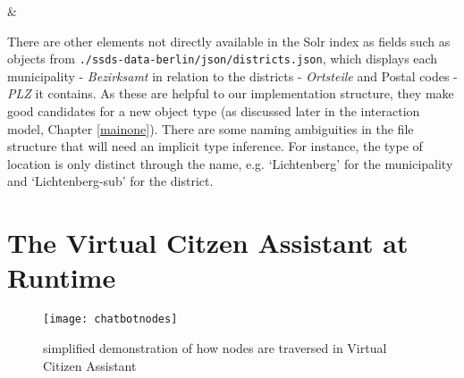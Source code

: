 \begin{table}[H]
\begin{tabu}
								 &  \\		

		
		
	\end{tabu}
\end{table}
















There are other elements not directly available in the Solr index as fields such as objects from \texttt{./ssds-data-berlin/json/districts.json}, which displays each municipality - \textit{Bezirksamt} in relation to the districts - \textit{Ortsteile} and Postal codes - \textit{PLZ} it contains.  As these are helpful to our implementation structure, they make good candidates for a new object type (as discussed later in the interaction model, Chapter \ref{mainone}).  There are some naming ambiguities in the file structure that will need an implicit type inference. For instance, the type of location is only distinct through the name, e.g. `Lichtenberg' for the municipality and `Lichtenberg-sub' for the district.






\section{The Virtual Citzen Assistant at Runtime}

\begin{wrapfigure}{l}{0.5\textwidth}
	\caption[simplified demonstration of nodes traversal]{simplified demonstration of how nodes are traversed in Virtual Citizen Assistant}
	\label{chatbotnodes}
	\texttt{[image: chatbotnodes]}
\end{wrapfigure}



